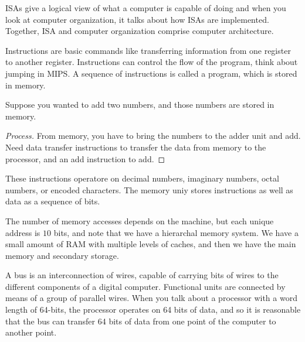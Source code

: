 \documentclass[12pt]{scrartcl}
\begin{document}
\begin{definition}
  ISAs give a logical view of what a computer is capable of doing and when you look 
  at computer organization, it talks about how ISAs are implemented. Together, ISA and computer 
  organization comprise computer architecture. 
\end{definition}

\begin{definition}
  Instructions are basic commands like transferring information from one 
  register to another register. Instructions can control the flow of the program, think about 
  jumping in MIPS. A sequence of instructions is called a program, which is stored in memory. 
\end{definition}

\begin{example}
  Suppose you wanted to add two numbers, and those numbers are stored in memory. 

  \begin{proof}[Process]
    From memory, you have to bring the numbers to the adder unit and add. Need data transfer instructions 
    to transfer the data from memory to the processor, and an add instruction to add. 
  \end{proof}
\end{example}

\begin{definition}[Data]
  These instructions operatore on decimal numbers, imaginary numbers, octal numbers, 
  or encoded characters. The memory uniy stores instructions as well as data as a sequence of bits. 
\end{definition}

\begin{definition}
  The number of memory accesses depends on the machine, but each unique address is 
  $10$ bits, and note that we have a hierarchal memory system. We have a small amount of RAM with 
  multiple levels of caches, and then we have the main memory and secondary storage. 
\end{definition}

\begin{definition}[Bus]
  A bus is an interconnection of wires, capable of carrying bits of wires to the different 
  components of a digital computer. Functional units are connected by means of a group of 
  parallel wires. When you talk about a processor with a word length of 64-bits, 
  the processor operates on 64 bits of data, and so it is reasonable that the bus can transfer 
  64 bits of data from one point of the computer to another point. 
\end{definition}
\end{document}
